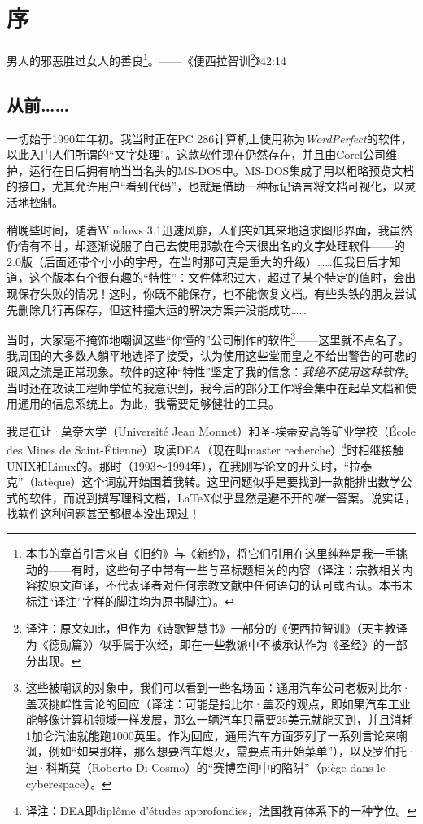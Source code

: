 \chapter*{序}

男人的邪恶胜过女人的善良\footnote{
    本书的章首引言来自《旧约》与《新约》，将它们引用在这里纯粹是我一手挑动的——有时，这些句子中带有一些与章标题相关的内容（译注：宗教相关内容按原文直译，不代表译者对任何宗教文献中任何语句的认可或否认。本书未标注“译注”字样的脚注均为原书脚注）。
}。——《便西拉智训\footnote{
    译注：原文如此，但作为《诗歌智慧书》一部分的《便西拉智训》（天主教译为《德勋篇》）似乎属于次经，即在一些教派中不被承认作为《圣经》的一部分出现。 
}》42:14

\section*{从前……}

一切始于1990年年初。我当时正在PC 286计算机上使用称为\textit{WordPerfect}的软件，以此入门人们所谓的“文字处理”。这款软件现在仍然存在，并且由Corel公司维护，运行在日后拥有响当当名头的MS-DOS中。MS-DOS集成了用以粗略预览文档的接口，尤其允许用户“看到代码”，也就是借助一种标记语言将文档可视化，以灵活地控制。

稍晚些时间，随着Windows 3.1迅速风靡，人们突如其来地追求图形界面，我虽然仍情有不甘，却逐渐说服了自己去使用那款在今天很出名的文字处理软件——的2.0版（后面还带个小小的字母，在当时那可真是重大的升级）……但我日后才知道，这个版本有个很有趣的“特性”：文件体积过大，超过了某个特定的值时，会出现保存失败的情况！这时，你既不能保存，也不能恢复文档。有些头铁的朋友尝试先删除几行再保存，但这种撞大运的解决方案并没能成功……

当时，大家毫不掩饰地嘲讽这些“你懂的”公司制作的软件\footnote{
    这些被嘲讽的对象中，我们可以看到一些名场面：通用汽车公司老板对比尔·盖茨挑衅性言论的回应（译注：可能是指比尔·盖茨的观点，即如果汽车工业能够像计算机领域一样发展，那么一辆汽车只需要25美元就能买到，并且消耗1加仑汽油就能跑1000英里。作为回应，通用汽车方面罗列了一系列言论来嘲讽，例如“如果那样，那么想要汽车熄火，需要点击开始菜单”），以及罗伯托·迪·科斯莫（Roberto Di Cosmo）的“赛博空间中的陷阱”（piège dans le cyberespace）。
}——这里就不点名了。我周围的大多数人躺平地选择了接受，认为使用这些堂而皇之不给出警告的可悲的跟风之流是正常现象。软件的这种“特性”坚定了我的信念：\textit{我绝不使用这种软件}。当时还在攻读工程师学位的我意识到，我今后的部分工作将会集中在起草文档和使用通用的信息系统上。为此，我需要足够健壮的工具。

我是在让·莫奈大学（Université Jean Monnet）和圣-埃蒂安高等矿业学校（École des Mines de Saint-Étienne）攻读DEA（现在叫master recherche）\footnote{
    译注：DEA即diplôme d'études approfondies，法国教育体系下的一种学位。
}时相继接触UNIX和Linux的。那时（1993～1994年），在我刚写论文的开头时，“拉泰克”（latèque）这个词就开始围着我转。这里问题似乎是要找到一款能排出数学公式的软件，而说到撰写理科文档，\LaTeX 似乎显然是避不开的\textit{唯一}答案。说实话，找软件这种问题甚至都根本没出现过！

